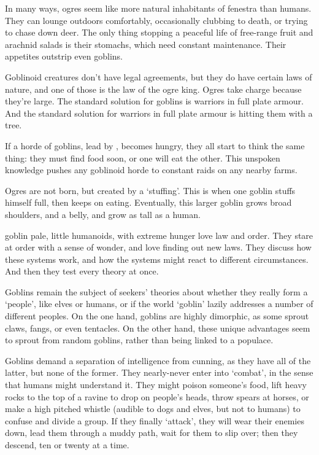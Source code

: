 \begin{multicols}{2}

\noindent
In many ways, \glspl{ogre} seem like more natural inhabitants of \gls{fenestra} than humans.
They can lounge outdoors comfortably, occasionally clubbing  to death, or trying to chase down deer.
The only thing stopping a peaceful life of free-range fruit and arachnid salads is their stomachs, which need constant maintenance.
Their appetites outstrip even goblins.

Goblinoid creatures don't have legal agreements, but they do have certain laws of nature, and one of those is the law of the \gls{ogre} king.
Ogres take charge because they're large.
The standard solution for goblins is warriors in full plate armour.
And the standard solution for warriors in full plate armour is  hitting them with a tree.

If a horde of goblins, lead by , becomes hungry, they all start to think the same thing: they must find food soon, or one will eat the other.
This unspoken knowledge pushes any goblinoid horde to constant raids on any nearby farms.

Ogres are not born, but created by a `stuffing'.
This is when one goblin stuffs himself full, then keeps on eating.
Eventually, this larger goblin grows broad shoulders, and a belly, and grow as tall as a human.


  {goblin}%
  {pale, little humanoids, with extreme hunger}%
love law and order.
They stare at order with a sense of wonder, and love finding out new laws.
They discuss how these systems work, and how the systems might react to different circumstances.
And then they test every theory at once.

Goblins remain the subject of \glspl{seeker}' theories about whether they really form a `people', like elves or humans, or if the world `goblin' lazily addresses a number of different peoples.
On the one hand, goblins are highly dimorphic, as some sprout claws, fangs, or even tentacles.
On the other hand, these unique advantages seem to sprout from random goblins, rather than being linked to a populace.

Goblins demand a separation of intelligence from cunning, as they have all of the latter, but none of the former.
They nearly-never enter into `combat', in the sense that humans might understand it.
They might poison someone's food, lift heavy rocks to the top of a ravine to drop on people's heads, throw spears at horses, or make a high pitched whistle (audible to dogs and elves, but not to humans) to confuse and divide a group.
If they finally `attack', they will wear their enemies down, lead them through a muddy path, wait for them to slip over; then they descend, ten or twenty at a time.


\end{multicols}
